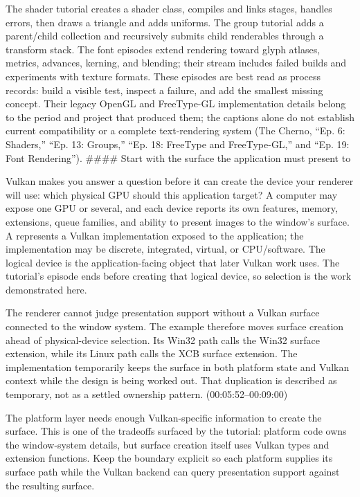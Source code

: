 The shader tutorial creates a shader class, compiles and links stages, handles errors, then draws a triangle and adds uniforms. The group tutorial adds a parent/child collection and recursively submits child renderables through a transform stack. The font episodes extend rendering toward glyph atlases, metrics, advances, kerning, and blending; their stream includes failed builds and experiments with texture formats. These episodes are best read as process records: build a visible test, inspect a failure, and add the smallest missing concept. Their legacy OpenGL and FreeType-GL implementation details belong to the period and project that produced them; the captions alone do not establish current compatibility or a complete text-rendering system (The Cherno, ``Ep. 6: Shaders,'' ``Ep. 13: Groups,'' ``Ep. 18: FreeType and FreeType-GL,'' and ``Ep. 19: Font Rendering''). \#\#\#\# Start with the surface the application must present to

Vulkan makes you answer a question before it can create the device your renderer will use: which physical GPU should this application target? A computer may expose one GPU or several, and each device reports its own features, memory, extensions, queue families, and ability to present images to the window's surface. A  represents a Vulkan implementation exposed to the application; the implementation may be discrete, integrated, virtual, or CPU/software. The logical device is the application-facing object that later Vulkan work uses. The tutorial's episode ends before creating that logical device, so selection is the work demonstrated here.

The renderer cannot judge presentation support without a Vulkan surface connected to the window system. The example therefore moves surface creation ahead of physical-device selection. Its Win32 path calls the Win32 surface extension, while its Linux path calls the XCB surface extension. The implementation temporarily keeps the surface in both platform state and Vulkan context while the design is being worked out. That duplication is described as temporary, not as a settled ownership pattern. (00:05:52--00:09:00)

The platform layer needs enough Vulkan-specific information to create the surface. This is one of the tradeoffs surfaced by the tutorial: platform code owns the window-system details, but surface creation itself uses Vulkan types and extension functions. Keep the boundary explicit so each platform supplies its surface path while the Vulkan backend can query presentation support against the resulting surface.

